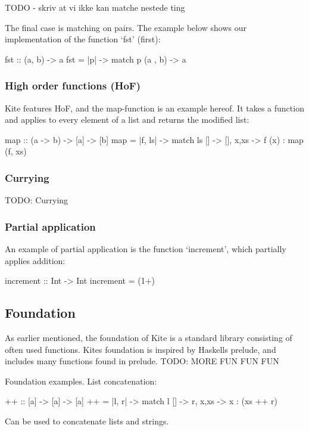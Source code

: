 TODO - skriv at vi ikke kan matche nestede ting

The final case is matching on pairs. The example below shows our implementation of the function `fst' (first):
\begin{kite}

fst :: (a, b) -> a
fst = |p| -> {
  match p {
    (a , b) -> a
  }
}
\end{kite}

\subsubsection{High order functions (HoF)}
Kite features HoF, and the map-function is an example hereof. It takes a function and applies to every element of a list and returns the modified list:

\begin{kite}

map :: (a -> b) -> [a] -> [b]
map = |f, ls| -> {
  match ls {
    [] -> [],
    x,xs -> f (x) : map (f, xs)
  }
}
\end{kite}

\subsubsection{Currying}
\label{subsubsec:currying}
TODO: Currying

\subsubsection{Partial application}

An example of partial application is the function `increment', which partially applies addition:

\begin{kite}

increment :: Int -> Int
increment = (1+)

\end{kite}

\subsection{Foundation}

As earlier mentioned, the foundation of Kite is a standard library
consisting of often used functions. Kites foundation is inspired by
Haskells prelude, and includes many functions found in
prelude. 
TODO: MORE FUN FUN FUN

Foundation examples.
List concatenation:
\begin{kite}

  {++} :: [a] -> [a] -> [a]
  {++} = |l, r| -> {
    match l {
      [] -> r,
      x,xs -> x : (xs ++ r)
    }
  }
\end{kite}
Can be used to concatenate lists and strings.

